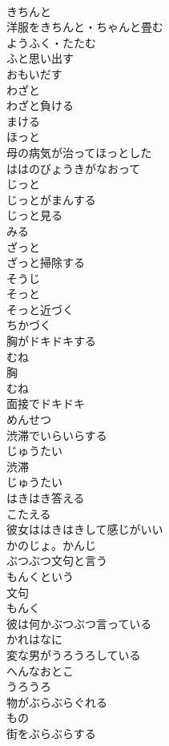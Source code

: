 \documentclass[8pt]{extreport}
\begin{document}
\begin{CJK}{UTF8}{min}
\\	きちんと	
\\	洋服をきちんと・ちゃんと畳む	
\\	ようふく・たたむ
\\	ふと思い出す	
\\	おもいだす
\\	わざと	
\\	わざと負ける	
\\	まける
\\	ほっと	
\\	母の病気が治ってほっとした	
\\	ははのびょうきがなおって
\\	じっと	
\\	じっとがまんする	
\\	じっと見る	
\\	みる
\\	ざっと	
\\	ざっと掃除する	
\\	そうじ
\\	そっと	
\\	そっと近づく	
\\	ちかづく
\\	胸がドキドキする	
\\	むね
\\	胸	
\\	むね
\\	面接でドキドキ	
\\	めんせつ
\\	渋滞でいらいらする	
\\	じゅうたい
\\	渋滞	
\\	じゅうたい
\\	はきはき答える	
\\	こたえる
\\	彼女ははきはきして感じがいい	
\\	かのじょ。かんじ
\\	ぶつぶつ文句と言う	
\\	もんくという
\\	文句	
\\	もんく
\\	彼は何かぶつぶつ言っている	
\\	かれはなに
\\	変な男がうろうろしている	
\\	へんなおとこ
\\	うろうろ	
\\	物がぶらぶらぐれる	
\\	もの
\\	街をぶらぶらする	

\end{CJK}
\end{document}
